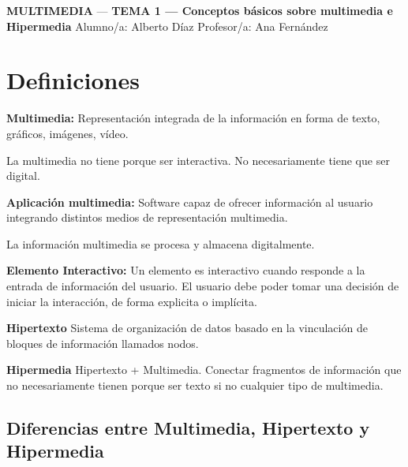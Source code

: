 \documentclass[11pt,a4paper]{article}
\newcommand{\asignatura}{MULTIMEDIA}
\newcommand{\tema}{TEMA 1 — Conceptos básicos sobre multimedia e Hipermedia}  %
\begin{document}
	{\large \textbf{\asignatura} \;—\; \textbf{\tema} \hfill}
	\faUser\; Alumno/a: Alberto Díaz\hfill
	\faChalkboardTeacher\; Profesor/a: Ana Fernández

	\vspace{0.6em}

	\tableofcontents

	\section{Definiciones}
	\begin{DefBox}
		\textbf{Multimedia:} Representación integrada de la información en forma de texto, gráficos, imágenes, vídeo.

		La multimedia no tiene porque ser interactiva. No necesariamente tiene que ser digital.
	\end{DefBox}



	\begin{DefBox}
		\textbf{Aplicación multimedia:} Software capaz de ofrecer información al usuario integrando distintos medios de representación multimedia.

		La información multimedia se procesa y almacena digitalmente.
	\end{DefBox}

	\begin{DefBox}
		\textbf{Elemento Interactivo: } Un elemento es interactivo cuando responde a la entrada de información del usuario. El usuario debe poder tomar una decisión de iniciar la interacción, de forma explicita o implícita.
	\end{DefBox}

	\begin{DefBox}
		\textbf{Hipertexto} Sistema de organización de datos basado en la vinculación de bloques de información llamados nodos.
	\end{DefBox}

	\begin{DefBox}
		\textbf{Hipermedia} Hipertexto + Multimedia. Conectar fragmentos de información que no necesariamente tienen porque ser texto si no cualquier tipo de multimedia.
	\end{DefBox}

	\subsection{Diferencias entre Multimedia, Hipertexto y Hipermedia}
\end{document}
